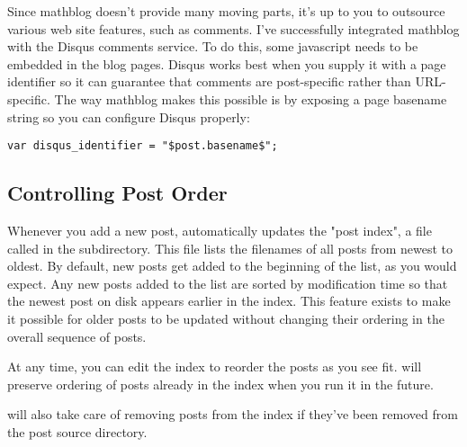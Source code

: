 \documentclass[11pt, letterpaper, oneside, titlepage]{book}
\begin{document}
Since mathblog doesn't provide many moving parts, it's up to you to
outsource various web site features, such as comments.  I've
successfully integrated mathblog with the Disqus comments service.  To
do this, some javascript needs to be embedded in the blog pages.
Disqus works best when you supply it with a page identifier so it can
guarantee that comments are post-specific rather than URL-specific.
The way mathblog makes this possible is by exposing a page basename
string so you can configure Disqus properly:

\begin{verbatim}
var disqus_identifier = "$post.basename$";
\end{verbatim}

\subsection{Controlling Post Order}

Whenever you add a new post,  automatically updates the "post
index", a file called  in the 
subdirectory.  This file lists the filenames of all posts from newest
to oldest.  By default, new posts get added to the beginning of the
list, as you would expect.  Any new posts added to the list are sorted
by modification time so that the newest post on disk appears earlier
in the index.  This feature exists to make it possible for older posts
to be updated without changing their ordering in the overall sequence
of posts.

At any time, you can edit the index to reorder the posts as you see
fit.   will preserve ordering of posts already in the index
when you run it in the future.

 will also take care of removing posts from the index if
they've been removed from the post source directory.
\end{document}
